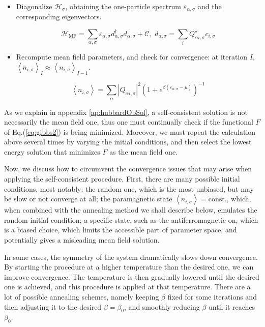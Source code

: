 \begin{itemize}
\item Diagonalize $\mathcal{H}_\sigma$, obtaining the one-particle spectrum $\varepsilon_{\alpha, \sigma}$ and the corresponding eigenvectors.

\begin{equation}
\mathcal{H}_{\text{MF}} = \sum_{\alpha, \sigma} \varepsilon_{\alpha, \sigma} d_{\alpha, \sigma}^\dagger d_{\alpha, \sigma} + \mathcal{C} , \,\, d_{\alpha, \sigma} = \sum_i Q_{\alpha i, \sigma}^\star c_{i,\sigma}
\end{equation}

\item Recompute mean field parameters, and check for convergence: at iteration $I$, $\left\langle n_{i,\sigma} \right\rangle_I \approx \left\langle n_{i,\sigma} \right\rangle_{I - 1}$.

\begin{equation}
\left\langle n_{i,\sigma} \right\rangle = \sum_\alpha | Q_{\alpha i, \sigma} |^2 ( 1 + e^ { \beta ( \varepsilon_{\alpha, \sigma} - \mu )} )^{-1}
\end{equation}

\end{itemize}

As we explain in appendix \ref{ap:hubbardObSol}, a self-consistent solution is not necessarily the mean field one, thus one must continually check if the functional $F$ of Eq.(\ref{eq:gibbs2}) is being minimized.
Moreover, we must repeat the calculation above several times by varying the initial conditions, and then select the lowest energy solution that minimizes $F$ as the mean field one.

Now, we discuss how to circumvent the convergence issues that may arise when applying the self-consistent procedure.
First, there are many possible initial conditions, most notably: the random one, which is the most unbiased, but may be slow or not converge at all; the paramagnetic state $\left\langle n_{i,\sigma} \right\rangle = \text{const.}$, which, when combined with the annealing method we shall describe below, emulates the random initial condition; a specific state, such as the antiferromagnetic on, which is a biased choice, which limits the accessible part of parameter space, and potentially gives a misleading mean field solution.

In some cases, the symmetry of the system dramatically slows down convergence.
By starting the procedure at a higher temperature than the desired one, we can improve convergence.
The temperature is then gradually lowered until the desired one is achieved, and this procedure is applied at that temperature.
There are a lot of possible annealing schemes, namely keeping $\beta$ fixed for some iterations and then adjusting it to the desired $\beta = \beta_0$, and smoothly reducing $\beta$ until it reaches $\beta_0$.

